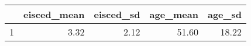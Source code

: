 \begin{table}[ht]
\centering
\begin{tabular}{rrrrr}
  \hline
 & eisced\_mean & eisced\_sd & age\_mean & age\_sd \\ 
  \hline
1 & 3.32 & 2.12 & 51.60 & 18.22 \\ 
   \hline
\end{tabular}
\end{table}
